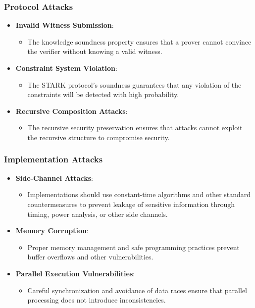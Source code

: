 \documentclass{article}
\theoremstyle{plain}
\theoremstyle{definition}
\theoremstyle{remark}
\theoremstyle{problem}
\begin{document}
\subsubsection{Protocol Attacks}
\begin{itemize}
    \item \textbf{Invalid Witness Submission}:
    \begin{itemize}
        \item The knowledge soundness property ensures that a prover cannot convince the verifier without knowing a valid witness.
    \end{itemize}

    \item \textbf{Constraint System Violation}:
    \begin{itemize}
        \item The STARK protocol's soundness guarantees that any violation of the constraints will be detected with high probability.
    \end{itemize}

    \item \textbf{Recursive Composition Attacks}:
    \begin{itemize}
        \item The recursive security preservation ensures that attacks cannot exploit the recursive structure to compromise security.
    \end{itemize}
\end{itemize}

\subsubsection{Implementation Attacks}
\begin{itemize}
    \item \textbf{Side-Channel Attacks}:
    \begin{itemize}
        \item Implementations should use constant-time algorithms and other standard countermeasures to prevent leakage of sensitive information through timing, power analysis, or other side channels.
    \end{itemize}

    \item \textbf{Memory Corruption}:
    \begin{itemize}
        \item Proper memory management and safe programming practices prevent buffer overflows and other vulnerabilities.
    \end{itemize}

    \item \textbf{Parallel Execution Vulnerabilities}:
    \begin{itemize}
        \item Careful synchronization and avoidance of data races ensure that parallel processing does not introduce inconsistencies.
    \end{itemize}
\end{itemize}
\end{document}

